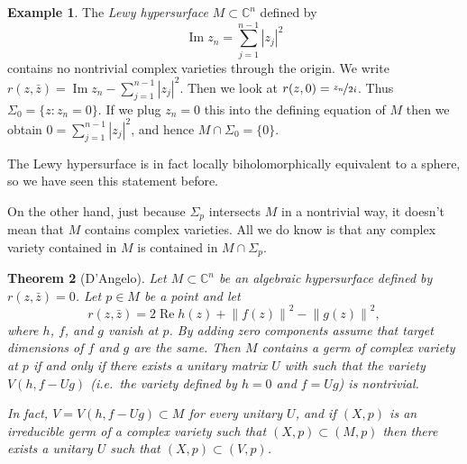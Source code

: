 \documentclass[12pt,openany]{book}
\renewcommand{\Re}{\operatorname{Re}}
\renewcommand{\Im}{\operatorname{Im}}
\newcommand{\abs}[1]{\left\lvert {#1} \right\rvert}
\newcommand{\norm}[1]{\left\lVert {#1} \right\rVert}
\newcommand{\C}{{\mathbb{C}}}
\newcommand{\myindex}[1]{#1\index{#1}}
\theoremstyle{plain}
\newtheorem{thm}{Theorem}[section]
\theoremstyle{remark}
\theoremstyle{definition}
\theoremstyle{exercise}
\theoremstyle{example}
\newtheorem{example}[thm]{Example}
\begin{document}
\begin{example}
The \emph{\myindex{Lewy hypersurface}} $M \subset \C^n$ defined by
\begin{equation}
\Im z_n = \sum_{j=1}^{n-1} \abs{z_j}^2
\end{equation}
contains no nontrivial complex varieties through the origin.
We write
$r(z,\bar{z}) = \Im z_n - \sum_{j=1}^{n-1} \abs{z_j}^2$.  Then we look
at $r(z,0) = \nicefrac{z_n}{2i}$.  Thus
$\Sigma_0 = \{ z : z_n = 0 \}$.  If we plug $z_n = 0$
this into the defining equation of $M$
then we obtain
$0 = \sum_{j=1}^{n-1} \abs{z_j}^2$, and hence $M \cap \Sigma_0 = \{ 0 \}$.

The Lewy hypersurface is in fact locally biholomorphically
equivalent to a sphere, so we have seen this statement
before.
\end{example}

On the other hand, just because $\Sigma_p$ intersects $M$ in a nontrivial
way,
it
doesn't mean that $M$ contains complex varieties.  All we do know is that 
any complex variety contained in $M$ is contained in $M \cap
\Sigma_p$.

\begin{thm}[D'Angelo] \label{theorem:algcplxinm}
Let $M \subset \C^n$ be an algebraic hypersurface defined by $r(z,\bar{z}) =
0$.  Let $p \in M$ be a point and let
\begin{equation}
r(z,\bar{z}) = 2 \Re h(z) + \norm{f(z)}^2-\norm{g(z)}^2 ,
\end{equation}
where $h$, $f$, and $g$ vanish at $p$.  By adding zero components
assume that target dimensions of $f$ and $g$ are the same.
Then $M$ contains a germ of complex
variety at $p$
if and only if there exists a unitary matrix $U$ with such that
the variety $V(h,f-Ug)$ (i.e.\ the variety defined by $h=0$ and $f=Ug$)
is nontrivial.

In fact, $V=V(h,f-Ug) \subset M$ for every unitary $U$, and if $(X,p)$
is an irreducible germ of a complex variety such that $(X,p) \subset (M,p)$
then there exists a unitary $U$ such that $(X,p) \subset (V,p)$.
\end{thm}
\end{document}
